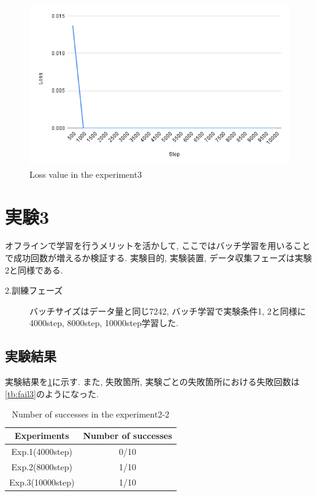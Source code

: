 \begin{figure}[h]
  \centering
  \includegraphics[keepaspectratio, scale=0.31]{images/exp2-10000.png}
  \caption{Loss value in the experiment3}
  \label{Fig:exp2-10000}
  \end{figure}
  
\newpage
\section{実験3}
オフラインで学習を行うメリットを活かして, ここではバッチ学習を用いることで成功回数が増えるか検証する. 実験目的, 実験装置, データ収集フェーズは実験2と同様である. 

\begin{description}
  \item[2.訓練フェーズ] バッチサイズはデータ量と同じ7242, バッチ学習で実験条件1, 2と同様に4000step, 8000step, 10000step学習した. 
\end{description}

\subsection{実験結果}
実験結果を\ref{tb:exp3}に示す. また, 失敗箇所, 実験ごとの失敗箇所における失敗回数は\ref{tb:fail3}のようになった.

\begin{table}[h]
  \centering
  \begin{tabular}{|c|c|} \hline
    Experiments & Number of successes \\ \hline
    Exp.1(4000step) & 0/10 \\ \hline
    Exp.2(8000step) & 1/10 \\ \hline
    Exp.3(10000step) & 1/10 \\ \hline
  \end{tabular}
  \caption{Number of successes in the experiment2-2}
  \label{tb:exp3}
\end{table}

